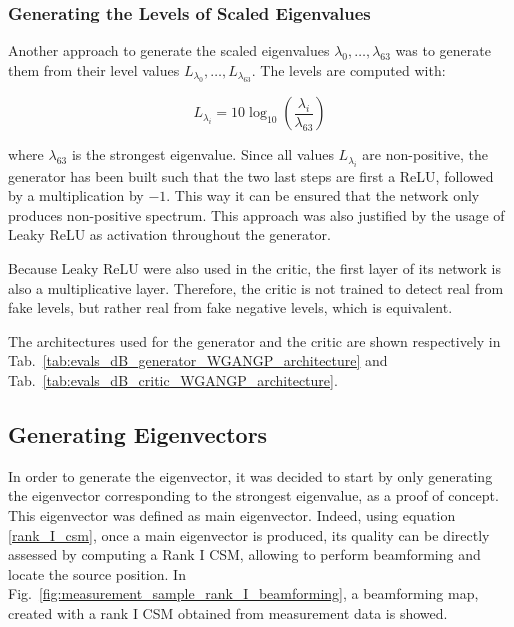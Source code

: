 \documentclass[11pt,a4paper,twoside]{report}
\begin{document}
\subsubsection{Generating the Levels of Scaled Eigenvalues}

Another approach to generate the scaled eigenvalues $\lambda_0, \dots, \lambda_{63}$ was to generate them from their level values $ L_{\lambda_0} , \dots,  L_{\lambda_{63}} $. The levels are computed with:

\begin{equation}
    L_{\lambda_i} = 10 \log_{10}(\frac{\lambda_i}{\lambda_{63}})
\end{equation}

where $\lambda_{63}$ is the strongest eigenvalue. Since all values $L_{\lambda_i}$ are non-positive, the generator has been built such that the two last steps are first a ReLU, followed by a multiplication by $-1$. This way it can be ensured that the network only produces non-positive spectrum. This approach was also justified by the usage of Leaky ReLU as activation throughout the generator. 

Because Leaky ReLU were also used in the critic, the first layer of its network is also a multiplicative layer. Therefore, the critic is not trained to detect real from fake levels, but rather real from fake negative levels, which is equivalent. 

The architectures used for the generator and the critic are shown respectively in Tab.~\ref{tab:evals_dB_generator_WGANGP_architecture} and Tab.~\ref{tab:evals_dB_critic_WGANGP_architecture}.


\subsection{Generating Eigenvectors}

In order to generate the eigenvector, it was decided to start by only generating the eigenvector corresponding to the strongest eigenvalue, as a proof of concept. This eigenvector was defined as main eigenvector. Indeed, using equation \ref{rank_I_csm}, once a main eigenvector is produced, its quality can be directly assessed by computing a Rank I CSM, allowing to perform beamforming and locate the source position. In Fig.~\ref{fig:measurement_sample_rank_I_beamforming}, a beamforming map, created with a rank I CSM obtained from measurement data is showed.
\end{document}
